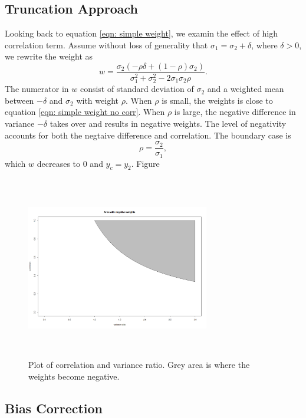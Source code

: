 \documentclass[]{article}
\begin{document}
\hypertarget{truncation-approach}{%
\subsection{Truncation Approach}\label{truncation-approach}}

Looking back to equation \ref{eqn: simple weight}, we examin the effect
of high correlation term. Assume without loss of generality that
\(\sigma_1 =\sigma_2 + \delta\), where \(\delta>0\), we rewrite the
weight as \begin{equation}
\label{eqn: w high corr}
w = \frac{\sigma_2(-\rho\delta+ (1-\rho)\sigma_2)}{\sigma_1^2+\sigma_2^2 -2\sigma_1\sigma_2\rho}.
\end{equation} The numerator in \(w\) consist of standard deviation of
\(\sigma_2\) and a weighted mean between \(-\delta\) and \(\sigma_2\)
with weight \(\rho\). When \(\rho\) is small, the weights is close to
equation \ref{eqn: simple weight no corr}. When \(\rho\) is large, the
negative difference in variance \(-\delta\) takes over and results in
negative weights. The level of negativity accounts for both the negtaive
difference and correlation. The boundary case is \begin{equation}
\label{eqn: corr boundary}
\rho = \frac{\sigma_2}{\sigma_1},
\end{equation} which \(w\) decreases to \(0\) and \(y_c = y_2\). Figure

\begin{figure}[!h]
\centering
\includegraphics[width=8cm, height=8cm]{./Output/Images/corr2Ratio.png}
\caption{Plot of correlation and variance ratio. Grey area is where the weights become negative.}\label{fig: corr2Ratio}
\end{figure}

\hypertarget{bias-correction}{%
\subsection{Bias Correction}\label{bias-correction}}
\end{document}
